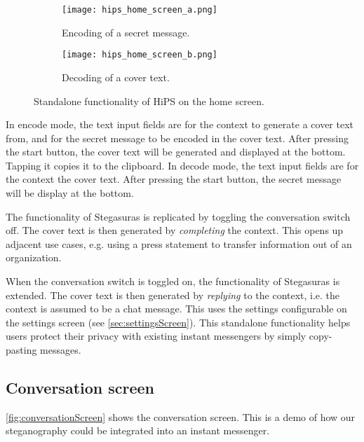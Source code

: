 \begin{figure}
	\begin{wide}
		\captionsetup{width=\linewidth}
		\begin{subfigure}{0.45\linewidth}
			\centering
			\texttt{[image: hips\_home\_screen\_a.png]}
			\caption{Encoding of a secret message.}
			\label{fig:homeScreenA}
		\end{subfigure}
        \hfill
		\begin{subfigure}{0.45\linewidth}
			\centering
			\texttt{[image: hips\_home\_screen\_b.png]}
			\caption{Decoding of a cover text.}
			\label{fig:homeScreenB}
		\end{subfigure}
		\caption[HiPS: Home screen]{Standalone functionality of HiPS on the home screen.}
		\label{fig:homeScreen}
	\end{wide}
\end{figure}

In encode mode, the text input fields are for the context to generate a cover text from, and for the secret message to be encoded in the cover text. After pressing the start button, the cover text will be generated and displayed at the bottom. Tapping it copies it to the clipboard. In decode mode, the text input fields are for the context the cover text. After pressing the start button, the secret message will be display at the bottom.

The functionality of Stegasuras is replicated by toggling the conversation switch off. The cover text is then generated by \textit{completing} the context. This opens up adjacent use cases, e.g. using a press statement to transfer information out of an organization.

When the conversation switch is toggled on, the functionality of Stegasuras is extended. The cover text is then generated by \textit{replying} to the context, i.e. the context is assumed to be a chat message. This uses the settings configurable on the settings screen (see \cref{sec:settingsScreen}). This standalone functionality helps users protect their privacy with existing instant messengers by simply copy-pasting messages.

\subsection{Conversation screen}
\label{sec:conversationScreen}
\cref{fig:conversationScreen} shows the conversation screen. This is a demo of how our steganography could be integrated into an instant messenger.

